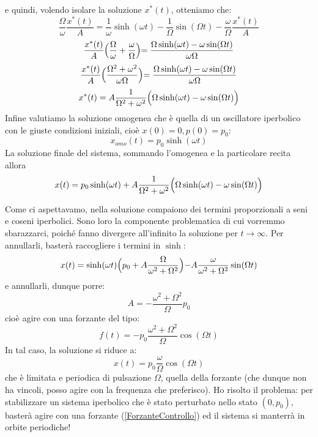 \documentclass[a4paper,openany]{article}
\begin{document}
	e quindi, volendo isolare la soluzione $x^{*}(t)$, otteniamo che:
	\begin{equation}\label{key}
		\dfrac{\Omega}{\omega} \dfrac{x^{*}(t)}{A} = \dfrac{1}{\omega}\sinh(\omega t) - \dfrac{1}{\Omega}\sin(\Omega t) - \dfrac{\omega}{\Omega} \dfrac{x^{*}(t)}{A}
	\end{equation}
	\begin{equation}\label{key}
		\dfrac{x^{*}(t)}{A} \Bigl(\dfrac{\Omega}{\omega} + \dfrac{\omega}{\Omega}\Bigl)=\dfrac{\Omega\sinh(\omega t)-\omega\sin(\Omega t)}{\omega\Omega}
	\end{equation}
	\begin{equation}\label{key}
		\dfrac{x^{*}(t)}{A} \Bigl(\dfrac{\Omega^2+\omega^2}{\omega \Omega}\Bigl)=\dfrac{\Omega\sinh(\omega t)-\omega\sin(\Omega t)}{\omega\Omega}
	\end{equation}
	\begin{equation}\label{key}
		x^{*}(t)= A \dfrac{1 }{\Omega^2+\omega^2}\Bigl(\Omega\sinh(\omega t) - \omega\sin(\Omega t)\Bigl)
	\end{equation}
	Infine valutiamo la soluzione omogenea che è quella di un oscillatore iperbolico con le giuste condizioni iniziali, cioè $x(0)= 0, p(0) = p_0$:
	\begin{equation}\label{key}
		x_{omo}(t) = p_0 \sinh(\omega t)
	\end{equation}
	La soluzione finale del sistema, sommando l'omogenea e la particolare recita allora
	\begin{equation}
		x(t) = p_{0}\sinh(\omega t) + A \dfrac{1 }{\Omega^2+\omega^2}\Bigl(\Omega\sinh(\omega t) - \omega\sin(\Omega t)\Bigl)
	\end{equation}
	
	Come ci aspettavamo, nella soluzione compaiono dei termini proporzionali a seni e coseni iperbolici. Sono loro la componente problematica di cui vorremmo sbarazzarci, poiché fanno divergere all'infinito la soluzione per $t\to\infty$. Per annullarli, basterà raccogliere i termini in $\sinh$:
	\begin{equation}\label{key}
		x(t) = \sinh(\omega t)\Bigl(p_0+ A \dfrac{\Omega}{\omega^2+\Omega^2}\Bigl) - A\dfrac{\omega}{\omega^2+\Omega^2}\sin(\Omega t)
	\end{equation}
	e annullarli, dunque porre:
	$$
	A = -\dfrac{\omega^{2} + \Omega^{2}}{\Omega}p_{0}
	$$
	cioè agire con una forzante del tipo:
	\begin{equation}
		f(t) = -p_{0}\dfrac{\omega^{2} + \Omega^{2}}{\Omega} \cos(\Omega t)
		\label{ForzanteControllo}
	\end{equation}
	In tal caso, la soluzione si riduce a:
	\begin{equation}
		x(t) = p_0\dfrac{\omega}{\Omega}\cos(\Omega t)
	\end{equation}
	che è limitata e periodica di pulsazione $\Omega$, quella della forzante (che dunque non ha vincoli, posso agire con la frequenza che preferisco). Ho risolto il problema: per stabilizzare un sistema iperbolico che è stato perturbato nello stato $(0,p_{0})$, basterà agire con una forzante (\ref{ForzanteControllo}) ed il sistema si manterrà in orbite periodiche!
	
\end{document}
